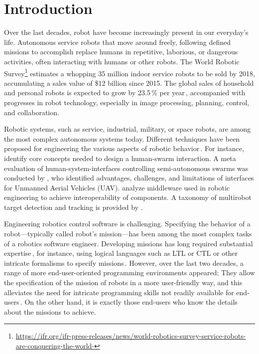 \section{Introduction}
Over the last decades, robot have become increasingly present in our everyday's life. Autonomous service robots that move around freely, following defined missions to accomplish replace humans in repetitive, laborious, or dangerous activities, often interacting with humans or other robots. The World Robotic Survey\footnote{\url{https://ifr.org/ifr-press-releases/news/world-robotics-survey-service-robots-are-conquering-the-world-}} estimates a whopping 35 million indoor service robots to be sold by 2018, accumulating a sales value of \$12 billion since 2015. The global sales of household and personal robots is expected to grow by 23.5\,\% per year\,\cite{sheng:online}, accompanied with progresses in robot technology, especially in image processing, planning, control, and collaboration.

Robotic systems, such as service, industrial, military, or space robots, are among the most complex autonomous systems today. Different techniques have been proposed for engineering the various aspects of robotic behavior\,\cite{Fernandez-Perdomo2010,DiRuscio2014,Doherty2013,AtrickD..Ulam2010}. For instance, \citet{Kolling2016} identify core concepts needed to design a human-swarm interaction. A meta evaluation of human-system-interfaces controlling semi-autonomous swarms was conducted by \citet{Hocraffer2017}, who identified advantages, challenges, and limitations of interfaces for Unmanned Aerial Vehicles (UAV). \citet{Mohamed2008} analyze middleware used in robotic engineering to achieve interoperability of components. A taxonomy of multirobot target detection and tracking is provided by \citet{Robin2016}.

Engineering robotics control software is challenging. Specifying the behavior of a robot---typically called robot's mission---has been among the most complex tasks of a robotics software engineer. Developing missions has long required substantial expertise\,\cite{Brugali2009,Aragao2016}, for instance, using logical languages such as LTL or CTL or other intricate formalisms to specify missions\,\cite{Luckcuck2018}.
However, over the last two decades, a range of more end-user-oriented programming environments appeared; They allow the specification of the mission of robots in a more user-friendly way, and this alleviates the need for intricate programming skills not readily available for end-users\,\cite{Weintrop2018,Bozhinoski2016b}. On the other hand, it is exactly those end-users who know the details about the missions to achieve.

